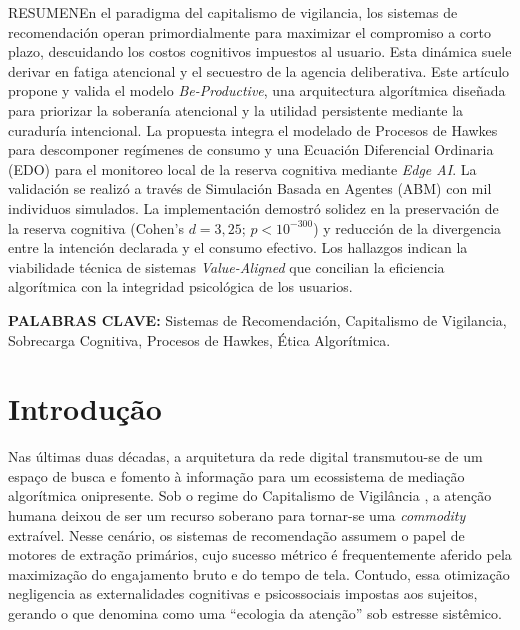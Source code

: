 \vspace{0.3cm}

\begin{abstractblock}{RESUMEN}{En el paradigma del capitalismo de vigilancia, los sistemas de recomendación operan primordialmente para maximizar el compromiso a corto plazo, descuidando los costos cognitivos impuestos al usuario. Esta dinámica suele derivar en fatiga atencional y el secuestro de la agencia deliberativa. Este artículo propone y valida el modelo \textit{Be-Productive}, una arquitectura algorítmica diseñada para priorizar la soberanía atencional y la utilidad persistente mediante la curaduría intencional. La propuesta integra el modelado de Procesos de Hawkes para descomponer regímenes de consumo y una Ecuación Diferencial Ordinaria (EDO) para el monitoreo local de la reserva cognitiva mediante \textit{Edge AI}. La validación se realizó a través de Simulación Basada en Agentes (ABM) con mil individuos simulados. La implementación demostró solidez en la preservación de la reserva cognitiva (Cohen’s $d = 3,25$; $p < 10^{-300}$) y reducción de la divergencia entre la intención declarada y el consumo efectivo. Los hallazgos indican la viabilidade técnica de sistemas \textit{Value-Aligned} que concilian la eficiencia algorítmica con la integridad psicológica de los usuarios.}
\end{abstractblock}
\noindent \textbf{PALABRAS CLAVE:} Sistemas de Recomendación, Capitalismo de Vigilancia, Sobrecarga Cognitiva, Procesos de Hawkes, Ética Algorítmica.

\newpage

\section{Introdução}

Nas últimas duas décadas, a arquitetura da rede digital transmutou-se de um espaço de busca e fomento à informação para um ecossistema de mediação algorítmica onipresente. Sob o regime do Capitalismo de Vigilância \parencite{zuboff2019}, a atenção humana deixou de ser um recurso soberano para tornar-se uma \textit{commodity} extraível. Nesse cenário, os sistemas de recomendação assumem o papel de motores de extração primários, cujo sucesso métrico é frequentemente aferido pela maximização do engajamento bruto e do tempo de tela. Contudo, essa otimização negligencia as externalidades cognitivas e psicossociais impostas aos sujeitos, gerando o que \textcite{citton2017} denomina como uma ``ecologia da atenção'' sob estresse sistêmico.

